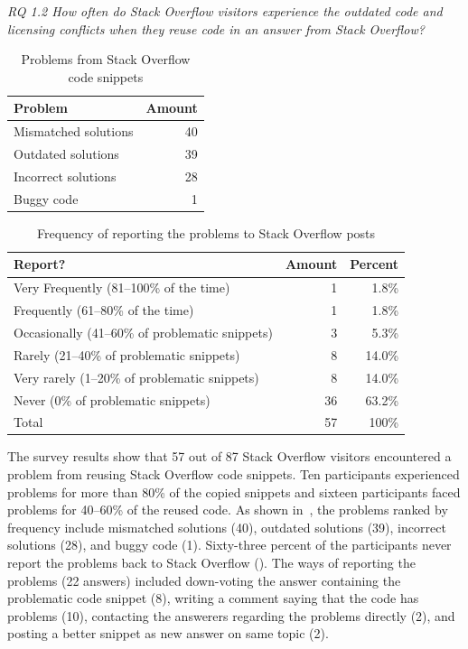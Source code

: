 \documentclass[10pt,journal,compsoc]{IEEEtran}
\begin{document}
\vspace{0.25cm}
\textit{RQ 1.2 How often do Stack Overflow
	visitors experience the outdated code and licensing conflicts when
	they reuse code in an answer from Stack Overflow?}
\vspace{0.25cm}

\begin{table}
	\centering
	\caption{Problems from Stack Overflow code snippets}
	\label{tab:visitor_survey_code_problems}
	\begin{tabular}{lr}
		\toprule
		Problem & Amount \\
		\midrule
		Mismatched solutions & 40 \\
		Outdated solutions & 39 \\
		Incorrect solutions	& 28 \\
		Buggy code & 1 \\
		\bottomrule
	\end{tabular}
\end{table}

\begin{table}
	\centering
	\caption{Frequency of reporting the problems to Stack Overflow posts}
	\label{tab:visitor_survey_report_problem}
	\begin{tabular}{lrr}
		\toprule
		Report? & Amount & Percent \\
		\midrule
		Very Frequently (81--100\% of the time)	& 1 & 1.8\% \\
		Frequently (61--80\% of the time) & 1 & 1.8\% \\
		Occasionally (41--60\% of problematic snippets) & 3 & 5.3\% \\
		Rarely (21--40\% of problematic snippets) & 8 & 14.0\% \\
		Very rarely (1--20\% of problematic snippets) & 8 & 14.0\% \\
		Never (0\% of problematic snippets) & 36 & 63.2\% \\
		\midrule
		Total & 57 & 100\% \\
		\bottomrule
	\end{tabular}
\end{table}

The survey results show that 57 out of 87 Stack Overflow visitors encountered a
problem from reusing Stack Overflow code snippets. Ten participants experienced
problems for more than 80\% of the copied snippets and sixteen participants
faced problems for 40--60\% of the reused code. As shown in~, 
the problems ranked by frequency
include mismatched solutions (40), outdated solutions (39), incorrect solutions
(28), and buggy code (1). Sixty-three percent of the participants never report
the problems back to Stack Overflow (). 
The ways of reporting the problems
(22 answers) included down-voting the answer containing the problematic code
snippet (8), writing a comment saying that the code has problems (10),
contacting the answerers regarding the problems directly (2), and posting a
better snippet as new answer on same topic (2).
\end{document}
